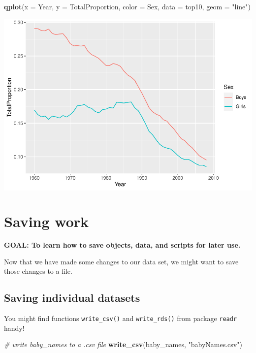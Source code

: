 \documentclass[
]{book}
\newenvironment{Shaded}{\begin{snugshade}}{\end{snugshade}}
\newcommand{\CommentTok}[1]{\textcolor[rgb]{0.56,0.35,0.01}{\textit{#1}}}
\newcommand{\DataTypeTok}[1]{\textcolor[rgb]{0.13,0.29,0.53}{#1}}
\newcommand{\KeywordTok}[1]{\textcolor[rgb]{0.13,0.29,0.53}{\textbf{#1}}}
\newcommand{\NormalTok}[1]{#1}
\newcommand{\StringTok}[1]{\textcolor[rgb]{0.31,0.60,0.02}{#1}}
\begin{document}
\begin{enumerate}
\begin{Shaded}
\begin{Highlighting}[]
\KeywordTok{qplot}\NormalTok{(}\DataTypeTok{x =}\NormalTok{ Year, }
      \DataTypeTok{y =}\NormalTok{ TotalProportion, }
      \DataTypeTok{color =}\NormalTok{ Sex,}
      \DataTypeTok{data =}\NormalTok{ top10,}
      \DataTypeTok{geom =} \StringTok{"line"}\NormalTok{)}
\end{Highlighting}
\end{Shaded}

  \includegraphics{R/Rintro/figures/unnamed-chunk-72-1.pdf}
\end{enumerate}

\hypertarget{saving-work}{%
\section{Saving work}\label{saving-work}}

\textbf{GOAL: To learn how to save objects, data, and scripts for later use.}

Now that we have made some changes to our data set, we might want to save those changes to a file.

\hypertarget{saving-individual-datasets}{%
\subsection{Saving individual datasets}\label{saving-individual-datasets}}

You might find functions \texttt{write\_csv()} and \texttt{write\_rds()} from package \texttt{readr} handy!

\begin{Shaded}
\begin{Highlighting}[]
\CommentTok{\# write baby\_names to a .csv file}
\KeywordTok{write\_csv}\NormalTok{(baby\_names, }\StringTok{"babyNames.csv"}\NormalTok{)}
\end{Highlighting}
\end{Shaded}
\end{document}
